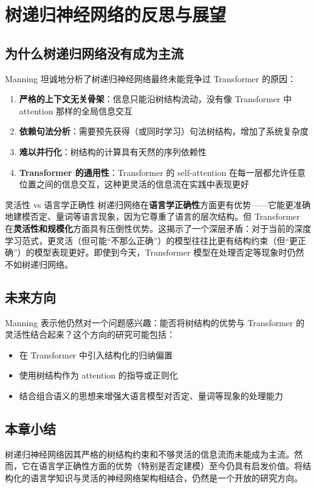 \section{树递归神经网络的反思与展望}

\subsection{为什么树递归网络没有成为主流}

Manning 坦诚地分析了树递归神经网络最终未能竞争过 Transformer 的原因：

\begin{enumerate}
    \item \textbf{严格的上下文无关骨架}：信息只能沿树结构流动，没有像 Transformer 中 attention 那样的全局信息交互
    \item \textbf{依赖句法分析}：需要预先获得（或同时学习）句法树结构，增加了系统复杂度
    \item \textbf{难以并行化}：树结构的计算具有天然的序列依赖性
    \item \textbf{Transformer 的通用性}：Transformer 的 self-attention 在每一层都允许任意位置之间的信息交互，这种更灵活的信息流在实践中表现更好
\end{enumerate}

\begin{warningbox}{灵活性 vs 语言学正确性}
树递归网络在\textbf{语言学正确性}方面更有优势——它能更准确地建模否定、量词等语言现象，因为它尊重了语言的层次结构。但 Transformer 在\textbf{灵活性和规模化}方面具有压倒性优势。这揭示了一个深层矛盾：对于当前的深度学习范式，更灵活（但可能``不那么正确''）的模型往往比更有结构约束（但``更正确''）的模型表现更好。即使到今天，Transformer 模型在处理否定等现象时仍然不如树递归网络。
\end{warningbox}

\subsection{未来方向}

Manning 表示他仍然对一个问题感兴趣：能否将树结构的优势与 Transformer 的灵活性结合起来？这个方向的研究可能包括：

\begin{itemize}
    \item 在 Transformer 中引入结构化的归纳偏置
    \item 使用树结构作为 attention 的指导或正则化
    \item 结合组合语义的思想来增强大语言模型对否定、量词等现象的处理能力
\end{itemize}

\subsection{本章小结}

树递归神经网络因其严格的树结构约束和不够灵活的信息流而未能成为主流。然而，它在语言学正确性方面的优势（特别是否定建模）至今仍具有启发价值。将结构化的语言学知识与灵活的神经网络架构相结合，仍然是一个开放的研究方向。


